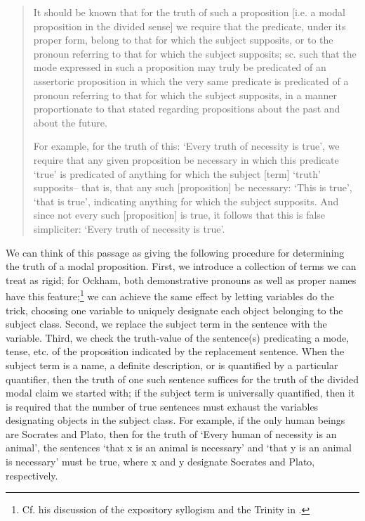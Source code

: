 \documentclass[]{article}
\begin{document}
\begin{quote}
	It should be known that for the truth of such a proposition [i.e. a modal proposition in the divided sense] we require that the predicate, under its proper form, belong to that for which the subject supposits, or to the pronoun referring to that for which the subject supposits; sc. such that the mode expressed in such a proposition may truly be predicated of an assertoric proposition in which the very same predicate is predicated of a pronoun referring to that for which the subject supposits, in a manner proportionate to that stated regarding propositions about the past and about the future. 
	
	For example, for the truth of this: `Every truth of necessity is true', we require that any given proposition be necessary in which this predicate `true' is predicated of anything for which the subject [term] `truth' supposits– that is, that any such [proposition] be necessary:  `This is true', `that is true', indicating anything for which the subject supposits. And since not every such [proposition] is true, it follows that this is false simpliciter: `Every truth of necessity is true'. \cite[II.10, p. 276]{OckhamSL} 
\end{quote}

We can think of this passage as giving the following procedure for determining the truth of a modal proposition. First, we introduce a collection of terms we can treat as rigid; for Ockham, both demonstrative pronouns as well as proper names have this feature;\footnote{Cf. his discussion of the expository syllogism and the Trinity in \cite[II.27, pp. 334-339]{OckhamSL}.} we can achieve the same effect by letting variables do the trick, choosing one variable to uniquely designate each object belonging to the subject class. Second, we replace the subject term in the sentence with the variable. Third, we check the truth-value of the sentence(s) predicating a mode, tense, etc. of the proposition indicated by the replacement sentence. When the subject term is a name, a definite description, or is quantified by a particular quantifier, then the truth of one such sentence suffices for the truth of the divided modal claim we started with; if the subject term is universally quantified, then it is required that the number of true sentences must exhaust the variables designating objects in the subject class. For example, if the only human beings are Socrates and Plato, then for the truth of `Every human of necessity is an animal', the sentences `that x is an animal is necessary' and `that y is an animal is necessary' must be true, where x and y designate Socrates and Plato, respectively.
\end{document}
